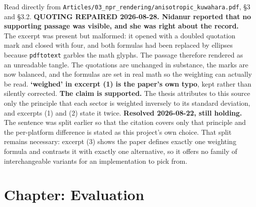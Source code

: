 \documentclass[11pt, a4paper]{article}
\begin{document}
\begin{Form}
  {Read directly from \texttt{\footnotesize Articles/03\_npr\_rendering/anisotropic\_kuwahara.pdf}, \S3 and \S3.2. \textbf{QUOTING REPAIRED 2026-08-28. Nidanur reported that no supporting passage was visible, and she was right about the record.} The excerpt was present but malformed: it opened with a doubled quotation mark and closed with four, and both formulas had been replaced by ellipses because \texttt{pdftotext} garbles the math glyphs. The passage therefore rendered as an unreadable tangle. The quotations are unchanged in substance, the marks are now balanced, and the formulas are set in real math so the weighting can actually be read. \textbf{`weighed' in excerpt (1) is the paper's own typo}, kept rather than silently corrected. \textbf{The claim is supported.} The thesis attributes to this source only the principle that each sector is weighted inversely to its standard deviation, and excerpts (1) and (2) state it twice. \textbf{Resolved 2026-08-22, still holding.} The sentence was split earlier so that the citation covers only that principle and the per-platform difference is stated as this project's own choice. That split remains necessary: excerpt (3) shows the paper defines exactly one weighting formula and contrasts it with exactly one alternative, so it offers no family of interchangeable variants for an implementation to pick from.}

\section*{Chapter: Evaluation}


\end{Form}
\end{document}
